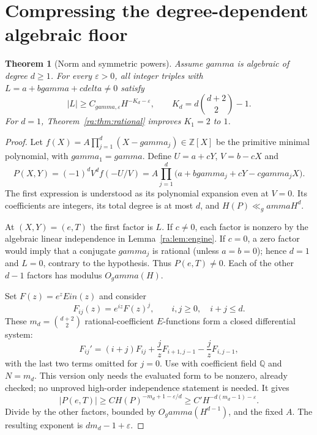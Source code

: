 \documentclass[11pt,a4paper]{article}
\newcommand{\Q}{\mathbb Q}
\newcommand{\Z}{\mathbb Z}
\newcommand{\Ht}{\operatorname{H}}
\DeclareMathOperator{\Ein}{Ein}
\newtheorem{theorem}{Theorem}[section]
\theoremstyle{definition}
\theoremstyle{remark}
\theoremstyle{plain}
\numberwithin{equation}{section}
\def\Ein{Ein}\def\gamma{gamma}\def\delta{delta}\def\eta{eta}%
\def\operatorname#1{#1}\def\mathrm#1{#1}}
\begin{document}
\section{Compressing the degree-dependent algebraic floor}
\begin{theorem}[Norm and symmetric powers]\label{ra:thm:norm}
Assume $\gamma$ is algebraic of degree $d\ge1$. For every $\varepsilon>0$, all integer triples with $L=a+b\gamma+c\delta\ne0$ satisfy
\begin{equation}\label{ra:eq:normfloor}
 |L|\ge C_{\gamma,\varepsilon}H^{-K_d-\varepsilon},\qquad
 K_d=d\binom{d+2}{2}-1.
\end{equation}
For $d=1$, Theorem~\ref{ra:thm:rational} improves $K_1=2$ to $1$.
\end{theorem}
\begin{proof}
Let $f(X)=A\prod_{j=1}^d(X-\gamma_j)\in\Z[X]$ be the primitive minimal polynomial, with $\gamma_1=\gamma$. Define $U=a+cY$, $V=b-cX$ and
\[
 P(X,Y)=(-1)^d V^d f(-U/V)
       =A\prod_{j=1}^d\bigl(a+b\gamma_j+cY-c\gamma_jX\bigr).
\]
The first expression is understood as its polynomial expansion even at $V=0$. Its coefficients are integers, its total degree is at most $d$, and $\Ht(P)\ll_\gamma H^d$.

At $(X,Y)=(e,T)$ the first factor is $L$. If $c\ne0$, each factor is nonzero by the algebraic linear independence in Lemma~\ref{ra:lem:engine}. If $c=0$, a zero factor would imply that a conjugate $\gamma_j$ is rational (unless $a=b=0$); hence $d=1$ and $L=0$, contrary to the hypothesis. Thus $P(e,T)\ne0$. Each of the other $d-1$ factors has modulus $O_\gamma(H)$.

Set $F(z)=e^z\Ein(z)$ and consider
\[
 F_{ij}(z)=e^{iz}F(z)^j,\qquad i,j\ge0,\quad i+j\le d.
\]
These $m_d=\binom{d+2}{2}$ rational-coefficient $E$-functions form a closed differential system:
\[
 F_{ij}'=(i+j)F_{ij}+\frac jz F_{i+1,j-1}-\frac jz F_{i,j-1},
\]
with the last two terms omitted for $j=0$. Use \cite[Theorem 1]{FRliouville} with coefficient field $\Q$ and $N=m_d$. This version only needs the evaluated form to be nonzero, already checked; no unproved high-order independence statement is needed. It gives
\[
 |P(e,T)|\ge C\Ht(P)^{-m_d+1-\varepsilon/d}
 \ge C' H^{-d(m_d-1)-\varepsilon}.
\]
Divide by the other factors, bounded by $O_\gamma(H^{d-1})$, and the fixed $A$. The resulting exponent is $dm_d-1+\varepsilon$.
\end{proof}
\end{document}
